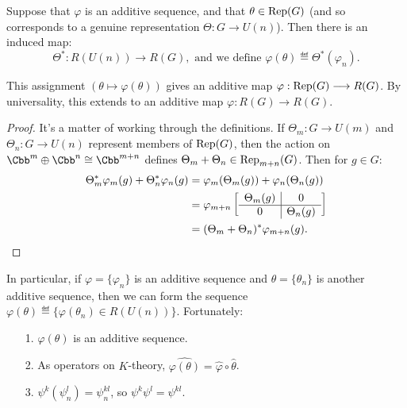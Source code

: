 %
Suppose that $\varphi$ is an additive sequence, and that $\theta\in \operatorname{Rep}(G)$ (and so corresponds to a genuine representation $\Theta:G\to U(n)$). Then there is an induced map:
\[\Theta^*:R(U(n))\to R(G),\text{ and we define }\varphi(\theta) \eqdef \Theta^*(\varphi_{n}).\]

\begin{claim}
This assignment $(\theta\mapsto \varphi(\theta))$ gives an additive map $\varphi:\operatorname{Rep}(G) \longrightarrow R(G)$. By universality, this extends to an additive map $\varphi:R(G)\to R(G)$.
\end{claim}
\begin{proof}
It's a matter of working through the definitions.  If $\Theta_m: G \to U(m)$ and $\Theta_n: G \to U(n)$ represent members of $\operatorname{Rep}(G)$, then the action on $\Cbb^m \oplus \Cbb^n \cong \Cbb^{m+n}$ defines $\Theta_m + \Theta_n \in \operatorname{Rep}_{m+n}(G)$.  Then for $g\in G$:
\begin{align*}
\Theta^*_m \varphi_m(g) + \Theta_n^* \varphi_n(g) & = \varphi_m(\Theta_m (g)) + \varphi_n(\Theta_n (g)) \\
& = \varphi_{m+n} \left[ \begin{array}{c|c} \Theta_m (g) & 0 \\ \hline 0 & \Theta_n (g) \end{array} \right] \\
& = (\Theta_m + \Theta_n)^* \varphi_{m+n} (g).\qedhere
\end{align*}
\end{proof}
\noindent In particular, if $\varphi = \{\varphi_n\}$ is an additive sequence and $\theta = \{ \theta_n \}$ is another additive sequence, then we can form the sequence $\varphi(\theta) \eqdef \{ \varphi(\theta_n) \in R(U(n))\}$. Fortunately:
\begin{lem}\hfil
\begin{enumerate}
\item[\textup{1}.] $\varphi(\theta)$ is an additive sequence.
\item[\textup{2}.] As operators on $K$-theory, $\widehat{\varphi(\theta)} = \hat \varphi \circ \hat \theta$.
\item[\textup{3}.] $\psi^k(\psi^l_n) = \psi^{kl}_n$, so $\psi^k \psi^l = \psi^{kl}$.
\end{enumerate}
\end{lem}

